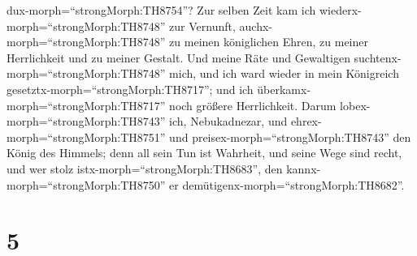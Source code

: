dux-morph=``strongMorph:TH8754''?  Zur selben Zeit kam ich
wiederx-morph=``strongMorph:TH8748'' zur Vernunft,
auchx-morph=``strongMorph:TH8748'' zu meinen königlichen Ehren, zu
meiner Herrlichkeit und zu meiner Gestalt. Und meine Räte und Gewaltigen
suchtenx-morph=``strongMorph:TH8748'' mich, und ich ward wieder in mein
Königreich gesetztx-morph=``strongMorph:TH8717''; und ich
überkamx-morph=``strongMorph:TH8717'' noch größere Herrlichkeit.
 Darum lobex-morph=``strongMorph:TH8743'' ich,
Nebukadnezar, und ehrex-morph=``strongMorph:TH8751'' und
preisex-morph=``strongMorph:TH8743'' den König des Himmels; denn all
sein Tun ist Wahrheit, und seine Wege sind recht, und wer stolz
istx-morph=``strongMorph:TH8683'', den
kannx-morph=``strongMorph:TH8750'' er
demütigenx-morph=``strongMorph:TH8682''.

\hypertarget{section-4}{%
\section{5}\label{section-4}}

